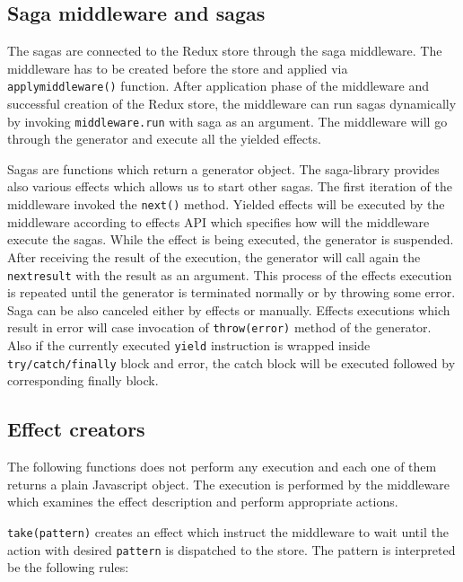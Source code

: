 \subsection{Saga middleware and sagas}
The sagas are connected to the Redux store through the saga middleware. The middleware has to be created before the store and applied via \texttt{applymiddleware()} function. After application phase of the middleware and successful creation of the Redux store, the middleware can run sagas dynamically by invoking \texttt{middleware.run} with saga as an argument. The middleware will go through the generator and execute all the yielded effects.

Sagas are functions which return a generator object. The saga-library provides also various effects which allows us to start other sagas. The first iteration of the middleware invoked the \texttt{next()} method. Yielded effects will be executed by the middleware according to effects API which specifies how will the middleware execute the sagas. While the effect is being executed, the generator is suspended. After receiving the result of the execution, the generator will call again the \texttt{next{result}} with the result as an argument. This process of the effects execution is repeated until the generator is terminated normally or by throwing some error. Saga can be also canceled either by effects or manually. Effects executions which result in error will case invocation of \texttt{throw(error)} method of the generator. Also
if the currently executed \texttt{yield} instruction is wrapped inside \texttt{try/catch/finally} block and error, the catch block will be executed followed by corresponding finally block.\cite{redux-saga-api}

\subsection{Effect creators}
The following functions does not perform any execution and each one of them returns a plain Javascript object. The execution is performed by the middleware which examines the effect description and perform appropriate actions.

\texttt{take(pattern)} creates an effect which instruct the middleware to wait until the action with desired \texttt{pattern} is dispatched to the store. The pattern is interpreted be the following rules: 

